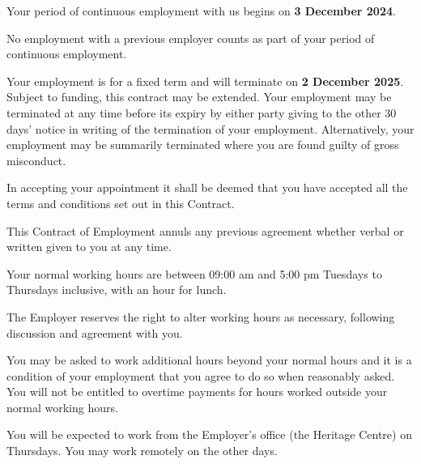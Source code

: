 \documentclass[a4paper,11pt,onecolumn ]{article}
\begin{document}
\begin{legal}
\item {}
\begin{legal}
  \item Your period of continuous employment with us begins on \textbf{3 December 2024}.
  \item No employment with a previous employer counts as part of your period of
  continuous employment.
  \item Your employment is for a fixed term and will terminate on \textbf{2 December 2025}.
  Subject to funding, this contract may be extended. Your employment may be
  terminated at any time before its expiry by either party giving to the other 30
  days’ notice in writing of the termination of your employment. Alternatively,
  your employment may be summarily terminated where you are found guilty of
  gross misconduct.
  \item In accepting your appointment it shall be deemed that you have accepted all the
  terms and conditions set out in this Contract.
  \item This Contract of Employment annuls any previous agreement whether verbal or
  written given to you at any time.
\end{legal}


\item {}
\begin{legal}
\item Your normal working hours are between 09:00 am and 5:00 pm Tuesdays to
Thursdays inclusive, with an hour for lunch.
\item The Employer reserves the right to alter working hours as necessary, following
discussion and agreement with you.
\item You may be asked to work additional hours beyond your normal hours and it is
a condition of your employment that you agree to do so when reasonably asked.
You will not be entitled to overtime payments for hours worked outside your
normal working hours.
\end{legal}


\item {}
You will be expected to work from the Employer's office (the Heritage Centre) on 
Thursdays. You may work remotely on the other days.


\end{legal}
\end{document}
